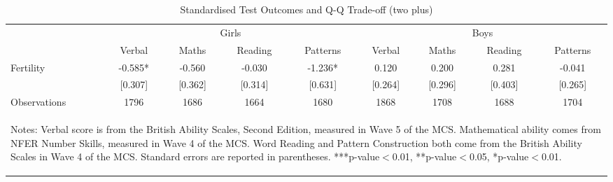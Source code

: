 \begin{table}[htbp]\centering
\def\sym#1{\ifmmode^{#1}\else\(^{#1}\)\fi}
\caption{Standardised Test Outcomes and Q-Q Trade-off (two plus)}
\begin{tabular}{l*{8}{c}}
\toprule
                    &\multicolumn{4}{c}{Girls}                                      &\multicolumn{4}{c}{Boys}                                       \\\cmidrule(lr){2-5}\cmidrule(lr){6-9}
                    &      Verbal   &       Maths   &     Reading   &    Patterns   &      Verbal   &       Maths   &     Reading   &    Patterns   \\
\midrule
Fertility           &      -0.585*  &      -0.560   &      -0.030   &      -1.236*  &       0.120   &       0.200   &       0.281   &      -0.041   \\
                    &     [0.307]   &     [0.362]   &     [0.314]   &     [0.631]   &     [0.264]   &     [0.296]   &     [0.403]   &     [0.265]   \\
\midrule
Observations        &        1796   &        1686   &        1664   &        1680   &        1868   &        1708   &        1688   &        1704   \\
\bottomrule\multicolumn{9}{p{15.8cm}}{\begin{footnotesize}
Notes: Verbal score is from the British Ability Scales,   
Second Edition, measured in Wave 5 of the MCS.            
Mathematical ability comes from NFER Number Skills,       
measured in Wave 4 of the MCS. Word Reading and Pattern   
Construction both come from the British Ability Scales in 
Wave 4 of the MCS. Standard errors are reported in parentheses. ***p-value$<$0.01, **p-value$<$0.05, *p-value$<$0.01.                                
\end{footnotesize}}\end{tabular}\end{table}
